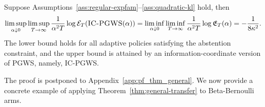 \documentclass[10pt]{article}
\newcommand{\ouralg}{{\textnormal{\textsc{PGWS}}}}
\theoremstyle{plain}
\begin{document}
\begin{theorem}
\label{thm:general-transfer}
Suppose Assumptions~\ref{ass:regular-expfam}--\ref{ass:quadratic-kl} hold, then
\[
    \limsup_{\alpha\downarrow0}
    \limsup_{T\to\infty}
    \frac{1}{\alpha^2T}
    \log \mathcal E_{T}(\text{\textsc{IC-PGWS}}(\alpha))
    =\liminf_{\alpha\downarrow0}
    \liminf_{T\to\infty}
    \frac{1}{\alpha^2T}
    \log \mathfrak E_{T}(\alpha)
    =
    -\frac{1}{8\kappa^2}.
\]
The lower bound holds for all adaptive policies satisfying the abstention
constraint, and the upper bound is attained by an information-coordinate version
of \ouralg{}, namely, \textsc{IC-PGWS}.
\end{theorem}
The proof is postponed to Appendix~\ref{app:pf_thm_general}. We now provide a concrete example of applying Theorem~\ref{thm:general-transfer} to Beta-Bernoulli arms.
\end{document}
